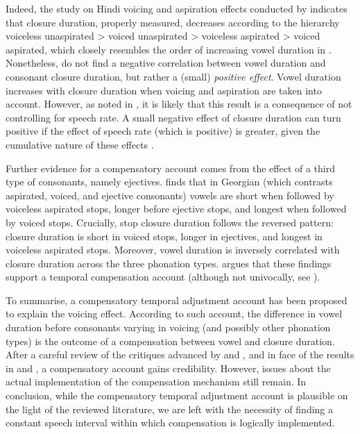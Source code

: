 \documentclass[preprint]{JASAnew}
\begin{document}
Indeed, the study on Hindi voicing and aspiration effects conducted by
\citet{durvasula2012} indicates that closure duration, properly
measured, decreases according to the hierarchy voiceless unaspirated
\textgreater{} voiced unaspirated \textgreater{} voiceless aspirated
\textgreater{} voiced aspirated, which closely resembles the order of
increasing vowel duration in \citet{maddieson1976}. Nonetheless,
\citet{durvasula2012} do not find a negative correlation between vowel
duration and consonant closure duration, but rather a (small)
\emph{positive effect}. Vowel duration increases with closure duration
when voicing and aspiration are taken into account. However, as noted in
\citet{begus2017}, it is likely that this result is a consequence of not
controlling for speech rate. A small negative effect of closure duration
can turn positive if the effect of speech rate (which is positive) is
greater, given the cumulative nature of these effects
\citep[p. 2177]{begus2017}.

Further evidence for a compensatory account comes from the effect of a
third type of consonants, namely ejectives. \citet{begus2017} finds that
in Georgian (which contrasts aspirated, voiced, and ejective consonants)
vowels are short when followed by voiceless aspirated stops, longer
before ejective stops, and longest when followed by voiced stops.
Crucially, stop closure duration follows the reversed pattern: closure
duration is short in voiced stops, longer in ejectives, and longest in
voiceless aspirated stops. Moreover, vowel duration is inversely
correlated with closure duration across the three phonation types.
\citet{begus2017} argues that these findings support a temporal
compensation account (although not univocally, see
\citealt[Section V]{begus2017}).

To summarise, a compensatory temporal adjustment account has been
proposed to explain the voicing effect. According to such account, the
difference in vowel duration before consonants varying in voicing (and
possibly other phonation types) is the outcome of a compensation between
vowel and closure duration. After a careful review of the critiques
advanced by \citet{chen1970} and \citet{maddieson1976}, and in face of
the results in \citet{slis1969} and \citet{begus2017}, a compensatory
account gains credibility. However, issues about the actual
implementation of the compensation mechanism still remain. In
conclusion, while the compensatory temporal adjustment account is
plausible on the light of the reviewed literature, we are left with the
necessity of finding a constant speech interval within which
compensation is logically implemented.
\end{document}
